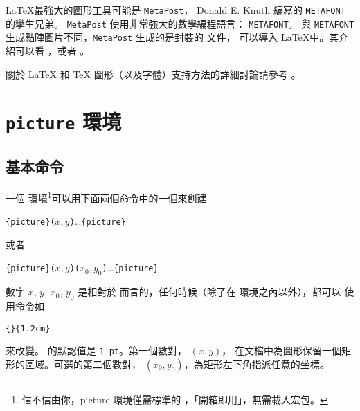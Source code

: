 \LaTeX 最強大的圖形工具可能是 \texttt{MetaPost}， Donald E.
Knuth 編寫的 \texttt{METAFONT} 的孿生兄弟。
\texttt{MetaPost} 使用非常強大的數學編程語言： \texttt{METAFONT}。
與 \texttt{METAFONT} 生成點陣圖片不同，\texttt{MetaPost} 生成的是封裝的 \PSi{} 文件，
可以導入 \LaTeX 中。其介紹可以看 \hobby，或者 \cite{ursoswald}。

%

關於 \LaTeX{} 和 \TeX{} 圖形（以及字體）支持方法的詳細討論請參考 \hoenig。

\section{\texttt{picture} 環境}


\subsection{基本命令}

一個  環境\footnote{信不信由你，picture 環境僅需標準的 \LaTeXe{}，「開箱即用」，無需載入宏包。}可以用下面兩個命令中的一個來創建
\begin{lscommand}
\verb|{picture}(|$x,y$\verb|)|\ldots{}\verb|{picture}|
\end{lscommand}
\noindent 或者
\begin{lscommand}
\verb|{picture}(|$x,y$\verb|)(|$x_0,y_0$\verb|)|\ldots{}\verb|{picture}|
\end{lscommand}
數字 $x,\,y,\,x_0,\,y_0$ 是相對於  而言的，任何時候（除了在  環境之內以外），都可以
使用命令如
\begin{lscommand}
\verb|{|\verb|}{1.2cm}|
\end{lscommand}
\noindent
來改變。 的默認值是 \texttt{1 pt}。第一個數對，
$(x,y)$， 在文檔中為圖形保留一個矩形的區域。可選的第二個數對，
$(x_0,y_0)$，為矩形左下角指派任意的坐標。

